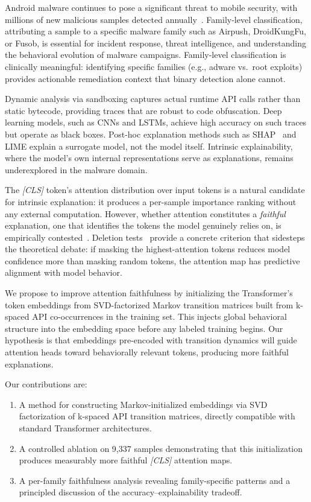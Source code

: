 \documentclass[12pt]{report}
\begin{document}
Android malware continues to pose a significant threat to mobile security,
with millions of new malicious samples detected annually~\citep{av_test_2023}.
Family-level classification, attributing a sample to a specific malware
family such as Airpush, DroidKungFu, or Fusob, is essential for incident
response, threat intelligence, and understanding the behavioral evolution
of malware campaigns. Family-level classification is clinically meaningful:
identifying specific families (e.g., adware vs.\ root exploits) provides
actionable remediation context that binary detection alone cannot.

Dynamic analysis via sandboxing captures actual runtime API calls rather
than static bytecode, providing traces that are robust to code obfuscation.
Deep learning models, such as CNNs and LSTMs, achieve
high accuracy on such traces but operate as black boxes. Post-hoc
explanation methods such as SHAP~\citep{lundberg2017shap} and LIME
explain a surrogate model, not the model itself. Intrinsic
explainability, where the model's own internal representations serve
as explanations, remains underexplored in the malware domain.

The \textit{[CLS]} token's attention distribution over input tokens
is a natural candidate for intrinsic explanation: it produces a
per-sample importance ranking without any external computation.
However, whether attention constitutes a \textit{faithful}
explanation, one that identifies the tokens the model genuinely
relies on, is empirically contested~\citep{jain2019attention,
wiegreffe2019attention}. Deletion tests~\citep{samek2017evaluating}
provide a concrete criterion that sidesteps the theoretical debate:
if masking the highest-attention tokens reduces model confidence
more than masking random tokens, the attention map has predictive
alignment with model behavior.

We propose to improve attention faithfulness by initializing the
Transformer's token embeddings from SVD-factorized Markov transition
matrices built from k-spaced API co-occurrences in the training set.
This injects global behavioral structure into the embedding space
before any labeled training begins. Our hypothesis is that embeddings
pre-encoded with transition dynamics will guide attention heads toward
behaviorally relevant tokens, producing more faithful explanations.

Our contributions are:
\begin{enumerate}
  \item A method for constructing Markov-initialized embeddings via SVD
    factorization of k-spaced API transition matrices, directly compatible
    with standard Transformer architectures.
  \item A controlled ablation on 9,337 samples demonstrating that this
    initialization produces measurably more faithful \textit{[CLS]}
    attention maps.
  \item A per-family faithfulness analysis revealing family-specific
    patterns and a principled discussion of the accuracy--explainability
    tradeoff.
\end{enumerate}
\end{document}
